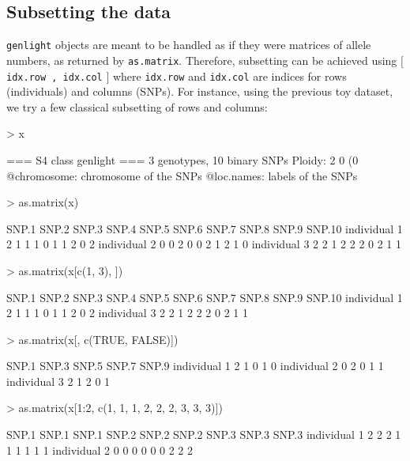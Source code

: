 \documentclass{article}
\begin{document}
\subsection{Subsetting the data}
\texttt{genlight} objects are meant to be handled as if they were matrices of allele numbers, as
returned by \texttt{as.matrix}.
Therefore, subsetting can be achieved using $[$ \texttt{idx.row , idx.col} $]$ where \texttt{idx.row}
and \texttt{idx.col} are indices for rows (individuals) and columns (SNPs).
For instance, using the previous toy dataset, we try a few classical subsetting of rows and columns:
\begin{Schunk}
\begin{Sinput}
> x
\end{Sinput}
\begin{Soutput}
 === S4 class genlight ===
 3 genotypes,  10 binary SNPs
 Ploidy: 2
 0 (0 %
 @chromosome: chromosome of the SNPs
 @loc.names: labels of the SNPs
\end{Soutput}
\begin{Sinput}
> as.matrix(x)
\end{Sinput}
\begin{Soutput}
             SNP.1 SNP.2 SNP.3 SNP.4 SNP.5 SNP.6 SNP.7 SNP.8 SNP.9 SNP.10
individual 1     2     1     1     1     0     1     1     2     0      2
individual 2     0     0     2     0     0     2     1     2     1      0
individual 3     2     2     1     2     2     2     0     2     1      1
\end{Soutput}
\begin{Sinput}
> as.matrix(x[c(1, 3), ])
\end{Sinput}
\begin{Soutput}
             SNP.1 SNP.2 SNP.3 SNP.4 SNP.5 SNP.6 SNP.7 SNP.8 SNP.9 SNP.10
individual 1     2     1     1     1     0     1     1     2     0      2
individual 3     2     2     1     2     2     2     0     2     1      1
\end{Soutput}
\begin{Sinput}
> as.matrix(x[, c(TRUE, FALSE)])
\end{Sinput}
\begin{Soutput}
             SNP.1 SNP.3 SNP.5 SNP.7 SNP.9
individual 1     2     1     0     1     0
individual 2     0     2     0     1     1
individual 3     2     1     2     0     1
\end{Soutput}
\begin{Sinput}
> as.matrix(x[1:2, c(1, 1, 1, 2, 2, 2, 3, 3, 3)])
\end{Sinput}
\begin{Soutput}
             SNP.1 SNP.1 SNP.1 SNP.2 SNP.2 SNP.2 SNP.3 SNP.3 SNP.3
individual 1     2     2     2     1     1     1     1     1     1
individual 2     0     0     0     0     0     0     2     2     2
\end{Soutput}
\end{Schunk}
\end{document}

